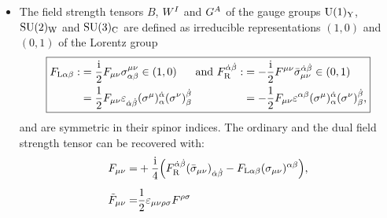 \begin{itemize}
\begin{equation}
{\begin{alignedat}{5}
\begin{pmatrix}
				\end{pmatrix}, \quad
				&&\bar{q}_{\mathrm{L}}^{C} = \begin{pmatrix}
					Q^{\alpha}, 0
				\end{pmatrix}, \quad
				&&\bar{u}_{\mathrm{R}}^{C} = \begin{pmatrix}
					0, u^{\dagger}_{\mathbb{C}, \dot{\alpha}}
				\end{pmatrix}, \quad
				&&\bar{d}_{\mathrm{R}}^{C} = \begin{pmatrix}
					0, d_{\mathbb{C}, \dot{\alpha}}^{\dagger}
				\end{pmatrix}.
			\end{alignedat} \label{eq:quarks}
		}
	\end{equation}
	\item The field strength tensors  $ B $, $ \tensor*{W}{^{I}} $ and $ \tensor*{G}{^{A}} $ of the gauge groups $ \mathrm{U}( 1 )_{\mathrm{Y}} $, $ \mathrm{SU}( 2 )_{\mathrm{W}} $ and $ \mathrm{SU}( 3 )_{\mathrm{C}} $ are defined as irreducible representations $ (1,0) $ and $ (0,1) $ of the Lorentz group
	\begin{equation}
		\boxed{
			\begin{alignedat}{5}
				F_{\mathrm{L} \alpha \beta} :&= \frac{\mi}{2} F_{\mu \nu} \sigma_{\alpha \beta}^{\mu \nu} \in (1,0)
				&&\text{\ and\ }&&
				F_{\mathrm{R}}^{\dot{\alpha} \dot{\beta}} :&&= -\frac{\mi}{2} F^{\mu \nu} \tensor*{\bar{\sigma}}{_{\mu \nu} ^{\dot{\alpha} \dot{\beta}}} \in (0,1) \\
				&= \frac{1}{2} F_{\mu \nu} \tensor*{\eps}{_{\dot{\alpha} \dot{\beta}}} \tensor*{(\sigma^{\mu})}{^{\dot{\alpha}}_{\alpha}} \tensor*{(\sigma^{\nu})}{^{\dot{\beta}}_{\beta}}
				&&\quad&& &&= -\frac{1}{2} F_{\mu \nu} \tensor*{\eps}{^{\alpha \beta}} \tensor*{(\sigma^{\mu})}{^{\dot{\alpha}}_{\alpha}} \tensor*{(\sigma^{\nu})}{^{\dot{\beta}}_{\beta}} \text{,}
			\end{alignedat}
			\label{eq:fieldStrengthTensorsSL2C}
		}
	\end{equation}
	and are symmetric in their spinor indices. The ordinary and the dual field strength tensor can be recovered with:
	\begin{equation}
		\begin{aligned}
			F_{\mu \nu} =& + \frac{\mi}{4} \Big(F_{\mathrm{R}}^{\dot{\alpha} \dot{\beta}} \tensor{(\bar{\sigma}_{\mu \nu})}{_{\dot{\alpha} \dot{\beta}}} - F_{\mathrm{L} \alpha \beta} \tensor{(\sigma_{\mu \nu})}{^{\alpha \beta}}\Big) \text{,} \\[0.5em]
			\tilde{F}_{\mu \nu} =& \frac{1}{2} \eps_{\mu \nu \rho \sigma} F^{\rho \sigma}

\end{aligned}
\end{equation}
\end{itemize}
